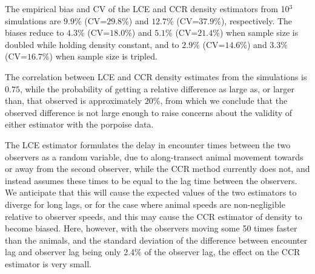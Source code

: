 \documentclass[useAMS, usenatbib, referee]{biom}\usepackage[]{graphicx}\usepackage[]{color}
\begin{document}

The empirical bias and CV of the LCE and CCR density estimators from 10$^3$ simulations are $9.9$\% (CV=$29.8$\%) and $12.7$\% (CV=$37.9$\%), respectively. The biases reduce to $4.3$\% (CV=$18.0$\%) and $5.1$\% (CV=$21.4$\%) when sample size is doubled while holding density constant, and to $2.9$\% (CV=$14.6$\%) and $3.3$\% (CV=$16.7$\%) when sample size is tripled.



The correlation between LCE and CCR density estimates from the simulations is $0.75$, while the probability of getting a relative difference as large as, or larger than, that observed is approximately $20$\%, from which we conclude that the observed difference is not large enough to raise concerns about the validity of either estimator with the porpoise data.



The LCE estimator formulates the delay in encounter times between the two observers as a random variable, due to along-transect animal movement towards or away from the second observer, while the CCR method currently does not, and instead assumes these times to be equal to the lag time between the observers. We anticipate that this will cause the expected values of the two estimators to diverge for long lags, or for the case where animal speeds are non-negligible relative to observer speeds, and this may cause the CCR estimator of density to become biased. Here, however, with the observers moving some 50 times faster than the animals, and the standard deviation of the difference between encounter lag and observer lag being only 2.4\% of the observer lag, the effect on the CCR estimator is very small.
\end{document}
